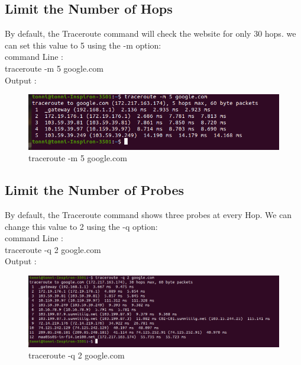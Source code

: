 \documentclass[11pt]{article}
\begin{document}
\subsection{Limit the Number of Hops}
	
 By default, the Traceroute command will check the website for only 30 hops. we can set this value to 5 using the -m option:\\[12pt]
command Line :\\[6pt]
  traceroute -m 5 google.com\\[12pt]   
        Output : 
  \begin{figure}[!h]
\centering
\includegraphics[width=\textwidth]{m_trace_google.png}
\caption{traceroute -m 5 google.com}
\end{figure}

\subsection{Limit the Number of Probes}
By default, the Traceroute command shows three probes at every Hop. We can change this value to 2 using the -q option:\\[12pt]
command Line :\\[6pt]
  traceroute -q 2 google.com\\[12pt]   
        Output : 
  \begin{figure}[!h]
\centering
\includegraphics[width=\textwidth]{q_trace_google.png}
\caption{traceroute -q 2 google.com}
\end{figure}
\end{document}
